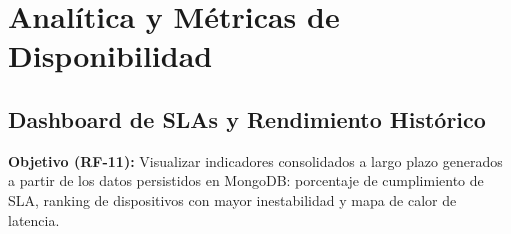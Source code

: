 \documentclass[12pt,a4paper]{report}
\begin{document}
\newpage
\chapter{Analítica y Métricas de Disponibilidad}

\section{Dashboard de SLAs y Rendimiento Histórico}

\textbf{Objetivo (RF-11):} Visualizar indicadores consolidados a largo plazo generados a partir de los datos persistidos en MongoDB: porcentaje de cumplimiento de SLA, ranking de dispositivos con mayor inestabilidad y mapa de calor de latencia.
\end{document}
